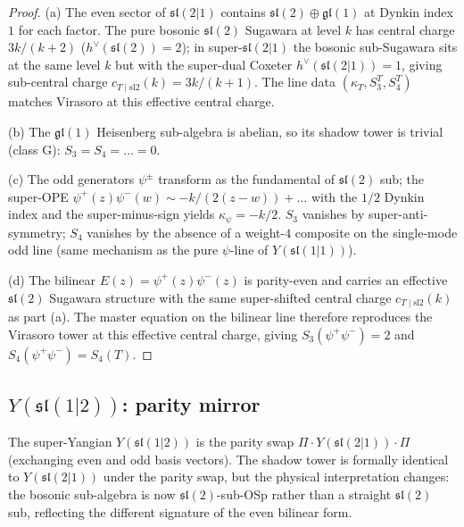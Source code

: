 \begin{proof}[Proof]
(a) The even sector of $\mathfrak{sl}(2|1)$ contains
$\mathfrak{sl}(2) \oplus \mathfrak{gl}(1)$ at Dynkin index $1$ for
each factor. The pure bosonic $\mathfrak{sl}(2)$ Sugawara at level
$k$ has central charge $3k/(k + 2)$ ($h^\vee(\mathfrak{sl}(2)) = 2$);
in super-$\mathfrak{sl}(2|1)$ the bosonic sub-Sugawara sits at the
same level $k$ but with the super-dual Coxeter
$h^\vee(\mathfrak{sl}(2|1)) = 1$, giving sub-central charge
$c_{T \mid \mathrm{sl2}}(k) = 3 k / (k + 1)$. The line data
$(\kappa_T, S_3^T, S_4^T)$ matches Virasoro at this effective
central charge.

(b) The $\mathfrak{gl}(1)$ Heisenberg sub-algebra is abelian, so its
shadow tower is trivial (class G): $S_3 = S_4 = \ldots = 0$.

(c) The odd generators $\psi^\pm$ transform as the fundamental of
$\mathfrak{sl}(2)$ sub; the super-OPE
$\psi^+(z) \psi^-(w) \sim -k/(2(z-w)) + \ldots$
with the $1/2$ Dynkin index and the super-minus-sign yields
$\kappa_\psi = -k/2$. $S_3$ vanishes by super-anti-symmetry; $S_4$
vanishes by the absence of a weight-$4$ composite on the single-mode
odd line (same mechanism as the pure $\psi$-line of
$Y(\mathfrak{sl}(1|1))$).

(d) The bilinear $E(z) = \psi^+(z) \psi^-(z)$ is parity-even and
carries an effective $\mathfrak{sl}(2)$ Sugawara structure with the
same super-shifted central charge $c_{T \mid \mathrm{sl2}}(k)$ as
part (a). The master equation on the bilinear line therefore
reproduces the Virasoro tower at this effective central charge,
giving $S_3(\psi^+\psi^-) = 2$ and $S_4(\psi^+\psi^-) = S_4(T)$.
\end{proof}

\subsection{\texorpdfstring{$Y(\mathfrak{sl}(1|2))$}{Y(sl(1|2))}: parity mirror}
\label{sec:sl12-closed-form}

The super-Yangian $Y(\mathfrak{sl}(1|2))$ is the parity swap
$\Pi \cdot Y(\mathfrak{sl}(2|1)) \cdot \Pi$ (exchanging even and odd
basis vectors). The shadow tower is formally identical to
$Y(\mathfrak{sl}(2|1))$ under the parity swap, but the physical
interpretation changes: the bosonic sub-algebra is now
$\mathfrak{sl}(2)$-sub-OSp rather than a straight
$\mathfrak{sl}(2)$ sub, reflecting the different signature of the
even bilinear form.

